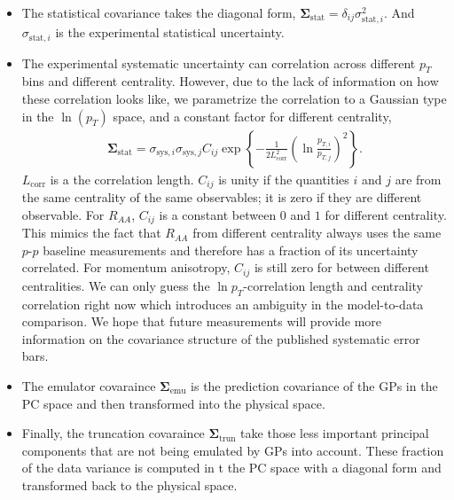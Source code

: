 \begin{itemize}
\item The statistical covariance  takes the diagonal form, $\mathbf{\Sigma}_{\textrm{stat}} = \delta_{ij}\sigma_{\textrm{stat}, i}^2$. And $\sigma_{\textrm{stat}, i}$ is the experimental statistical uncertainty.
\item The experimental systematic uncertainty can correlation across different $p_T$ bins and different centrality. However, due to the lack of information on how these correlation looks like, we parametrize the correlation to a Gaussian type in the $\ln(p_T)$ space, and a constant factor for different centrality,
\begin{eqnarray}
\mathbf{\Sigma}_{\textrm{stat}} = \sigma_{\textrm{sys}, i}\sigma_{\textrm{sys}, j} C_{ij} \exp\left\{-\frac{1}{2 L_{\textrm{corr}}^2} \left(\ln\frac{p_{T, i}}{p_{T, j}}\right)^2 \right\}.
\end{eqnarray}
$L_{\textrm{corr}}$ is a the correlation length. 
$C_{ij}$ is unity if the quantities $i$ and $j$ are from the same centrality of the same observables; it is zero if they are different observable. 
For $R_{AA}$, $C_{ij}$ is a constant between $0$ and $1$ for different centrality. This mimics the fact that $R_{AA}$ from different centrality always uses the same $p$-$p$ baseline measurements and therefore has a fraction of its uncertainty correlated.
For momentum anisotropy, $C_{ij}$ is still zero for between different centralities.
We can only guess the $\ln p_T$-correlation length and centrality correlation right now which introduces an ambiguity in the model-to-data comparison.
We hope that future measurements will provide more information on the covariance structure of the published systematic error bars.
\item The emulator covaraince $\mathbf{\Sigma}_{\textrm{emu}}$ is the prediction covariance of the GPs in the PC space and then transformed into the physical space.
\item Finally, the truncation covaraince $\mathbf{\Sigma}_{\textrm{trun}}$ take those less important principal components that are not being emulated by GPs into account. These fraction of the data variance is computed in t the PC space with a diagonal form and transformed back to the physical space.
\end{itemize}

